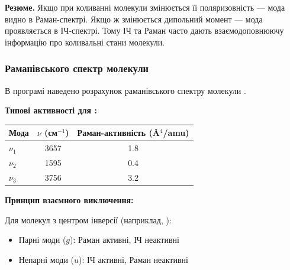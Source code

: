 \textbf{Резюме.}
Якщо при коливанні молекули змінюється її поляризовність — мода видно в Раман-спектрі.
Якщо ж змінюється дипольний момент — мода проявляється в ІЧ-спектрі.
Тому ІЧ та Раман часто дають взаємодоповнюючу інформацію про коливальні стани молекули.

\subsubsection{Раманівського спектр молекули }


В програмі  наведено розрахунок раманівського спектру молекули .

\textbf{Типові активності для :}
\begin{center}
    \begin{tabular}{lcc}
        \toprule
        Мода    & $\nu$ (см$^{-1}$) & Раман-активність (Å$^4$/amu) \\
        \midrule
        $\nu_1$ & 3657              & 1.8                          \\
        $\nu_2$ & 1595              & 0.4                          \\
        $\nu_3$ & 3756              & 3.2                          \\
        \bottomrule
    \end{tabular}
\end{center}


\textbf{Принцип взаємного виключення:}

Для молекул з центром інверсії (наприклад, ):
\begin{itemize}
    \item Парні моди ($g$): Раман активні, ІЧ неактивні
    \item Непарні моди ($u$): ІЧ активні, Раман неактивні
\end{itemize}

